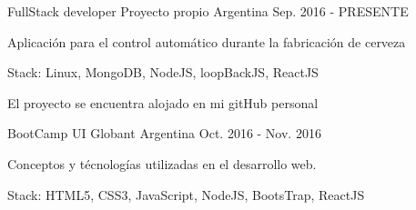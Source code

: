 


\begin{cventries}

\cventry
{FullStack developer} %
{Proyecto propio} %
{Argentina} %
{Sep. 2016 - PRESENTE} %
{ %
\begin{cvitems}
\item {Aplicación para el control automático durante la fabricación de cerveza}
\item {Stack: Linux, MongoDB, NodeJS, loopBackJS, ReactJS}
\item {El proyecto se encuentra alojado en mi gitHub personal}
\end{cvitems}
}


\cventry
{BootCamp UI} %
{Globant} %
{Argentina} %
{Oct. 2016 - Nov. 2016} %
{ %
\begin{cvitems}
\item {Conceptos y técnologías utilizadas en el desarrollo web.}
\item {Stack: HTML5, CSS3, JavaScript, NodeJS, BootsTrap, ReactJS}
\end{cvitems}
}


\end{cventries}
